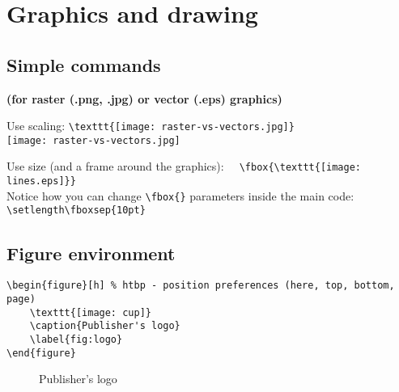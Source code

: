 \documentclass[a4paper,11pt]{article}
\begin{document}
\section{Graphics and drawing}
\subsection{Simple commands}

\textbf{(for raster (.png, .jpg) or vector (.eps) graphics)}

\bigskip
Use scaling: \verb|\texttt{[image: raster-vs-vectors.jpg]}| \\
\texttt{[image: raster-vs-vectors.jpg]}  

\bigskip

Use size (and a frame around the graphics): \verb|	\fbox{\texttt{[image: lines.eps]}}| \\
Notice how you can change \verb|\fbox{}| parameters inside the main code:
\verb|\setlength\fboxsep{10pt}| \\

\setlength\fboxsep{10pt} %
\setlength\fboxrule{.5pt} %
 	
 
\subsection{Figure environment}
\begin{lstlisting}[breaklines]
\begin{figure}[h] % htbp - position preferences (here, top, bottom, page)
	\texttt{[image: cup]}
	\caption{Publisher's logo}
	\label{fig:logo}
\end{figure}
\end{lstlisting}

\begin{figure}[h] %

		\centering
		
		\setlength\fboxsep{5pt} %
		\setlength\fboxrule{.2pt} %
		\caption{Publisher's logo}
		\label{fig:logo}
	\usetikzlibrary{calc, positioning, shapes.arrows}
\end{figure}

\end{document}
